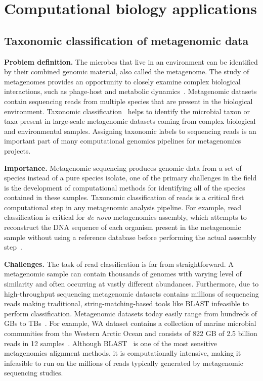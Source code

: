 
\section{Computational biology applications}


\subsection{Taxonomic classification of metagenomic data}

\textbf{Problem definition.}
The microbes that live in an environment can be identified by their combined genomic material, also called the metagenome.
The study of metagenomes provides an opportunity to closely examine complex biological interactions, such as phage-host and metabolic dynamics~\cite{national2007new}.
Metagenomic datasets contain sequencing reads from multiple species that are present in the biological environment.
%
Taxonomic classification~\cite{wood2014kraken} helps to identify the microbial taxon or taxa present in large-scale  metagenomic datasets coming from complex biological and environmental samples. Assigning taxonomic labels to sequencing reads is an important part of many computational genomics pipelines for metagenomics projects.

\noindent
\textbf{Importance.}
Metagenomic sequencing produces genomic data from a set of species instead of a pure species isolate, one of the primary challenges in the field is the development of computational methods for identifying all of the species contained in these samples.
%
Taxonomic classification of reads is a critical first computational step in any metagenomic analysis pipeline.
For example, read classification is critical for \emph{de novo} metagenomics assembly, which attempts to reconstruct the DNA sequence of each organism present in the metagenomic sample without using a reference database before performing the actual assembly step~\cite{venter2004environmental,brady2009phymm,brady2011phymmbl,rosen2008metagenome,segata2012metagenomic}.

\noindent
\textbf{Challenges.}
The task of read classification is far from straightforward.
A metagenomic sample can contain thousands of genomes with varying level of similarity and often occurring at vastly different abundances. Furthermore, due to high-throughput sequencing metagenomic datasets contains millions of sequencing reads making traditional, string-matching-based tools like BLAST infeasible to perform classification. Metagenomic datasets today easily range from hundreds of GBs to TBs~\cite{hofmeyr2020terabase}. For example, WA dataset contains a collection of marine microbial communities from the Western Arctic Ocean and consists of 822 GB of 2.5 billion reads in 12 samples~\cite{hofmeyr2020terabase}.
%
Although BLAST~\cite{altschul1990basic} is one of the most sensitive metagenomics alignment methods, it is computationally intensive, making it infeasible to run on the millions of reads typically generated by metagenomic sequencing studies.

